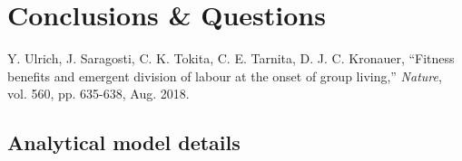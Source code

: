 \documentclass[11pt]{article}
\begin{document}
\section{Conclusions \& Questions} \label{sec:conclusions}


\begin{thebibliography}{99}

 Y. Ulrich, J. Saragosti, C. K. Tokita, C. E. Tarnita, D. J. C. Kronauer, ``Fitness benefits and emergent division of labour at the onset of group living,'' \textit{Nature}, vol. 560, pp. 635-638, Aug. 2018.

\end{thebibliography}

\begin{appendices}

\section{Analytical model details}

\end{appendices}
\end{document}
